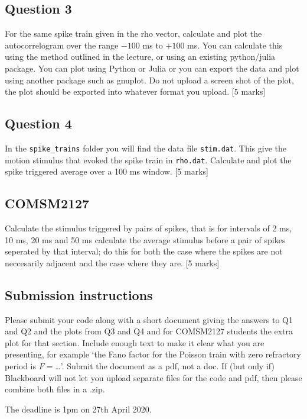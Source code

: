 \documentclass[12pt]{article}
\begin{document}
\subsection*{Question 3}
For the same spike train given in the rho vector, calculate and plot the autocorrelogram over the range $-100$ ms to $+100$ ms. You can calculate this using the method outlined in the lecture, or using an existing python/julia package. You can plot using Python or Julia or you can export the data and plot using another package such as gnuplot. Do not upload a screen shot of the plot, the plot should be exported into whatever format you upload. [5 marks]

\subsection*{Question 4} 

In the \texttt{spike\_trains} folder you will find the data file
\texttt{stim.dat}. This give the motion stimulus that evoked the spike
train in \texttt{rho.dat}. Calculate and plot the spike triggered
average over a 100 ms window.  [5 marks]

\subsection*{COMSM2127}

Calculate the stimulus triggered by pairs of spikes, that is for
intervals of 2 ms, 10 ms, 20 ms and 50 ms calculate the average
stimulus before a pair of spikes seperated by that interval; do this
for both the case where the spikes are not neccesarily adjacent and
the case where they are. [5 marks]

\subsection*{Submission instructions}

Please submit your code along with a short document giving the answers
to Q1 and Q2 and the plots from Q3 and Q4 and for COMSM2127 students the extra
plot for that section. Include enough text to make it clear what you
are presenting, for example \lq{}the Fano factor for the Poisson train
with zero refractory period is $F=$\ldots\rq{}. Submit the document as
a pdf, not a doc. If (but only if) Blackboard will not let you upload separate files for the code and pdf, then please combine both files in a .zip.

The deadline is 1pm on 27th April 2020.
\end{document}

